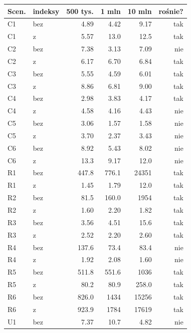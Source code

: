 \begin{tabular}{llrrrr}
\toprule
Scen. & indeksy & 500 tys. & 1 mln & 10 mln & rośnie? \\
\midrule
C1 & bez & \num{4.89} & \num{4.42} & \num{9.17} & tak \\
C1 & z & \num{5.57} & \num{13.0} & \num{12.5} & tak \\
C2 & bez & \num{7.38} & \num{3.13} & \num{7.09} & nie \\
C2 & z & \num{6.17} & \num{6.70} & \num{6.84} & tak \\
C3 & bez & \num{5.55} & \num{4.59} & \num{6.01} & tak \\
C3 & z & \num{8.86} & \num{6.81} & \num{9.00} & tak \\
C4 & bez & \num{2.98} & \num{3.83} & \num{4.17} & tak \\
C4 & z & \num{4.58} & \num{4.16} & \num{4.43} & nie \\
C5 & bez & \num{3.06} & \num{1.57} & \num{1.58} & nie \\
C5 & z & \num{3.70} & \num{2.37} & \num{3.43} & nie \\
C6 & bez & \num{8.92} & \num{5.43} & \num{8.02} & nie \\
C6 & z & \num{13.3} & \num{9.17} & \num{12.0} & nie \\
R1 & bez & \num{447.8} & \num{776.1} & \num{24351} & tak \\
R1 & z & \num{1.45} & \num{1.79} & \num{12.0} & tak \\
R2 & bez & \num{81.5} & \num{160.0} & \num{1954} & tak \\
R2 & z & \num{1.60} & \num{2.20} & \num{1.82} & tak \\
R3 & bez & \num{3.56} & \num{4.51} & \num{15.6} & tak \\
R3 & z & \num{2.52} & \num{2.20} & \num{2.60} & tak \\
R4 & bez & \num{137.6} & \num{73.4} & \num{83.4} & nie \\
R4 & z & \num{1.92} & \num{2.08} & \num{1.60} & nie \\
R5 & bez & \num{511.8} & \num{551.6} & \num{1036} & tak \\
R5 & z & \num{80.2} & \num{80.9} & \num{258.0} & tak \\
R6 & bez & \num{826.0} & \num{1434} & \num{15256} & tak \\
R6 & z & \num{923.9} & \num{1784} & \num{17619} & tak \\
U1 & bez & \num{7.37} & \num{10.7} & \num{4.82} & nie \\

\end{tabular}
